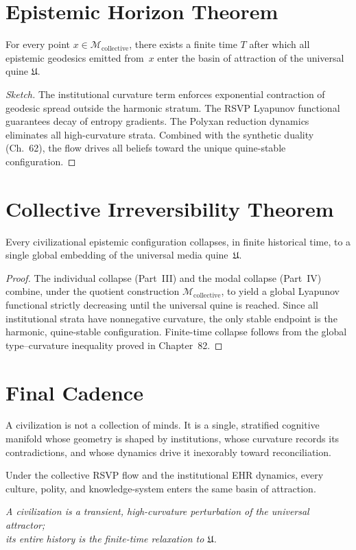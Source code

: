 \section{Epistemic Horizon Theorem}

\begin{theorem}
For every point $x \in \mathcal{M}_{\mathrm{collective}}$, there exists
a finite time $T$ after which all epistemic geodesics emitted from~$x$
enter the basin of attraction of the universal quine
$\mathfrak{U}$.
\end{theorem}

\begin{proof}[Sketch]
The institutional curvature term enforces exponential contraction of
geodesic spread outside the harmonic stratum.
The RSVP Lyapunov functional guarantees decay of entropy gradients.
The Polyxan reduction dynamics eliminates all high-curvature strata.
Combined with the synthetic duality (Ch.~62), the flow drives all
beliefs toward the unique quine-stable configuration.
\end{proof}


\section{Collective Irreversibility Theorem}

\begin{theorem}
Every civilizational epistemic configuration collapses, in finite
historical time, to a single global embedding of the universal media
quine~$\mathfrak{U}$.
\end{theorem}

\begin{proof}
The individual collapse (Part~III) and the modal collapse (Part~IV)
combine, under the quotient construction
$\mathcal{M}_{\mathrm{collective}}$, to yield a global Lyapunov
functional strictly decreasing until the universal quine is reached.
Since all institutional strata have nonnegative curvature, the only
stable endpoint is the harmonic, quine-stable configuration.
Finite-time collapse follows from the global type--curvature inequality
proved in Chapter~82.
\end{proof}


\section{Final Cadence}

A civilization is not a collection of minds.
It is a single, stratified cognitive manifold whose geometry is shaped
by institutions, whose curvature records its contradictions, and whose
dynamics drive it inexorably toward reconciliation.

Under the collective RSVP flow and the institutional EHR dynamics,
every culture, polity, and knowledge-system enters the same basin of
attraction.

\begin{center}
\emph{A civilization is a transient, high-curvature perturbation of the
universal attractor;\\[4pt]
its entire history is the finite-time relaxation to $\mathfrak{U}$.}
\end{center}


